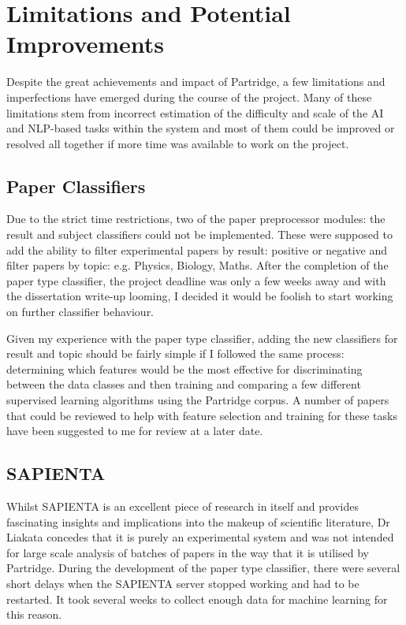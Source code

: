 \section{ Limitations and Potential Improvements }

Despite the great achievements and impact of Partridge, a few limitations and
imperfections have emerged during the course of the project. Many of these
limitations stem from incorrect estimation of the difficulty and scale
of the AI and NLP-based tasks within the system and most of them could be
improved or resolved all together if more time was available to work on the
project.

\subsection{ Paper Classifiers}

Due to the strict time restrictions, two of the paper preprocessor modules: the
result and subject classifiers could not be implemented. These were supposed to
add the ability to filter experimental papers by result: positive or negative
and filter papers by topic: e.g. Physics, Biology, Maths. After the completion
of the paper type classifier, the project deadline was only a few weeks away
and with the dissertation write-up looming, I decided it would be foolish to
start working on further classifier behaviour.

Given my experience with the paper type classifier, adding the new classifiers
for result and topic should be fairly simple if I followed the same process:
determining which features would be the most effective for discriminating
between the data classes and then training and comparing a few different
supervised learning algorithms using the Partridge corpus. A number of papers
that could be reviewed to help with feature selection and training for these
tasks have been suggested to me for review at a later date.

\subsection{ SAPIENTA }

Whilst SAPIENTA is an excellent piece of research in itself and provides
fascinating insights and implications into the makeup of scientific literature,
Dr Liakata concedes that it is purely an experimental system and was not
intended for large scale analysis of batches of papers in the way that it is
utilised by Partridge. During the development of the paper type classifier,
there were several short delays when the SAPIENTA server stopped working and
had to be restarted. It took several weeks to collect enough data for machine
learning for this reason. 

